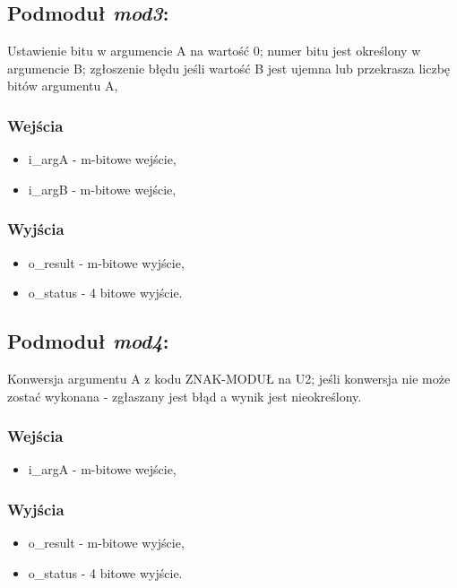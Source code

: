 \subsection{Podmoduł \emph{mod3}:}
Ustawienie bitu w argumencie A na wartość 0; numer bitu jest określony w argumencie B; zgłoszenie błędu jeśli wartość B jest ujemna lub przekrasza liczbę bitów argumentu A,

\subsubsection*{Wejścia}
\begin{itemize}
	\item i\_argA - m-bitowe wejście,
	\item i\_argB - m-bitowe wejście,
\end{itemize}
\subsubsection*{Wyjścia}
\begin{itemize}
	\item o\_result - m-bitowe wyjście,
	\item o\_status - 4 bitowe wyjście.
\end{itemize}

\subsection{Podmoduł \emph{mod4}:}
Konwersja argumentu A z kodu ZNAK-MODUŁ na U2; jeśli konwersja nie może zostać wykonana - zgłaszany jest błąd a wynik jest nieokreślony.

\subsubsection*{Wejścia}
\begin{itemize}
	\item i\_argA - m-bitowe wejście,
\end{itemize}
\subsubsection*{Wyjścia}
\begin{itemize}
	\item o\_result - m-bitowe wyjście,
	\item o\_status - 4 bitowe wyjście.
\end{itemize}